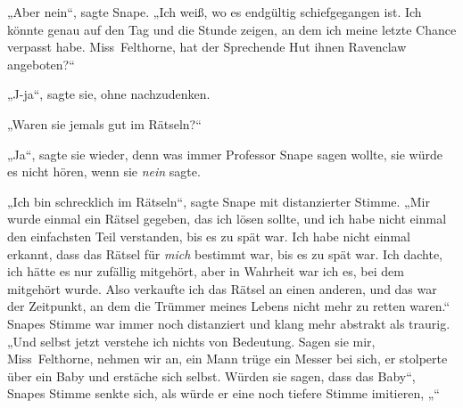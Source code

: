 „Aber nein“, sagte Snape.
„Ich weiß, wo es endgültig schiefgegangen ist. Ich könnte genau auf den Tag und die Stunde zeigen, an dem ich meine letzte Chance verpasst habe. Miss~Felthorne, hat der Sprechende Hut ihnen Ravenclaw angeboten?“

„J-ja“, sagte sie, ohne nachzudenken.

„Waren sie jemals gut im Rätseln?“

„Ja“, sagte sie wieder, denn was immer Professor Snape sagen wollte, sie würde es nicht hören, wenn sie \emph{nein} sagte.

„Ich bin schrecklich im Rätseln“, sagte Snape mit distanzierter Stimme.
„Mir wurde einmal ein Rätsel gegeben, das ich lösen sollte, und ich habe nicht einmal den einfachsten Teil verstanden, bis es zu spät war. Ich habe nicht einmal erkannt, dass das Rätsel für \emph{mich} bestimmt war, bis es zu spät war. Ich dachte, ich hätte es nur zufällig mitgehört, aber in Wahrheit war ich es, bei dem mitgehört wurde. Also verkaufte ich das Rätsel an einen anderen, und das war der Zeitpunkt, an dem die Trümmer meines Lebens nicht mehr zu retten waren.“ Snapes Stimme war immer noch distanziert und klang mehr abstrakt als traurig.
„Und selbst jetzt verstehe ich nichts von Bedeutung. Sagen sie mir, Miss~Felthorne, nehmen wir an, ein Mann trüge ein Messer bei sich, er stolperte über ein Baby und erstäche sich selbst. Würden sie sagen, dass das Baby“, Snapes Stimme senkte sich, als würde er eine noch tiefere Stimme imitieren,
„“

